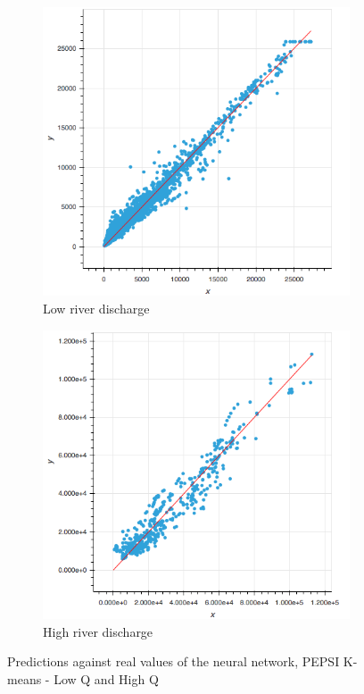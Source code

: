 \begin{figure}[H]
    \begin{subfigure}{0.45 \textwidth}
        \centering
        \includegraphics[scale = 0.4]{Graph/predictions_pepsiK_LQ.png}
        \caption{Low river discharge}
        \label{subfig:predLQ}
    \end{subfigure}
    \centering
     \begin{subfigure}{0.45 \textwidth}
         \centering
        \includegraphics[scale = 0.4]{Graph/predictions_pepsiK_HQ.png}
        \caption{High river discharge}
        \label{subfig:predHQ}
     \end{subfigure}
 
 \caption{Predictions against real values of the neural network, PEPSI K-means - Low Q and High Q}
 \label{fig:predictionsANN}
\end{figure}

